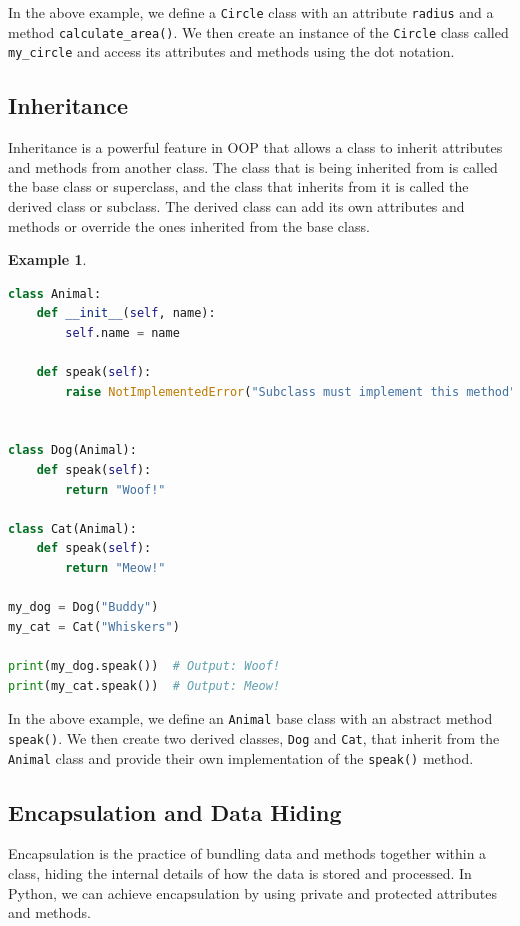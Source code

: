 \documentclass[12pt]{article}
\newtheorem{Example}{Example}[section]
\begin{document}
In the above example, we define a \texttt{Circle} class with an attribute \texttt{radius} and a method \texttt{calculate\_area()}. We then create an instance of the \texttt{Circle} class called \texttt{my\_circle} and access its attributes and methods using the dot notation.

\subsection{Inheritance}

Inheritance is a powerful feature in OOP that allows a class to inherit attributes and methods from another class. The class that is being inherited from is called the base class or superclass, and the class that inherits from it is called the derived class or subclass. The derived class can add its own attributes and methods or override the ones inherited from the base class.

\begin{Example}
\begin{lstlisting}[language=Python]
class Animal:
    def __init__(self, name):
        self.name = name

    def speak(self):
        raise NotImplementedError("Subclass must implement this method")


class Dog(Animal):
    def speak(self):
        return "Woof!"

class Cat(Animal):
    def speak(self):
        return "Meow!"

my_dog = Dog("Buddy")
my_cat = Cat("Whiskers")

print(my_dog.speak())  # Output: Woof!
print(my_cat.speak())  # Output: Meow!
\end{lstlisting}
\end{Example}

In the above example, we define an \texttt{Animal} base class with an abstract method \texttt{speak()}. We then create two derived classes, \texttt{Dog} and \texttt{Cat}, that inherit from the \texttt{Animal} class and provide their own implementation of the \texttt{speak()} method.

\subsection{Encapsulation and Data Hiding}

Encapsulation is the practice of bundling data and methods together within a class, hiding the internal details of how the data is stored and processed. In Python, we can achieve encapsulation by using private and protected attributes and methods.
\end{document}
